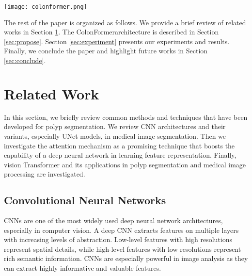 \documentclass{article}
\newcommand{\ModelName}{ColonFormer}
\begin{document}
\begin{figure*}[ht!]
\centering
\texttt{[image: colonformer.png]} 
\caption{The overall architecture of our \ModelName contains three components: an encoder, a decoder, and a refinement module. The encoder is based on the Mix Transformer backbone. The decoder starts with a pyramid pooling module (PPM), where its outputs are combined layer-wise with the output feature maps of the encoder at multi levels to produce a global map. The refinement module aims to gradually refine the boundary of the global map to yield the final accurate segmentation. 
Besides this predicted output, the global map and two intermediate maps are also passed into the training loss in a deep supervision manner. Before calculating the training loss, all refined maps are upsampled back to the original image input size.}
\label{fig:colonformer}
\end{figure*}

The rest of the paper is organized as follows. We provide a brief review of related works in Section \ref{sec:related}. The \ModelName architecture is described in Section \ref{sec:propose}. Section \ref{sec:experiment} presents our experiments and results. Finally, we conclude the paper and highlight future works in Section \ref{sec:conclude}.


\section{Related Work}
\label{sec:related}
In this section, we briefly review common methods and techniques that have been developed for polyp segmentation. We review CNN architectures and their variants, especially UNet models, in medical image segmentation. Then we investigate the attention mechanism as a promising technique that boosts the capability of a deep neural network in learning feature representation. Finally, vision Transformer and its applications in polyp segmentation and medical image processing are investigated.

\subsection{Convolutional Neural Networks}
CNNs are one of the most widely used deep neural network architectures, especially in computer vision. A deep CNN extracts features on multiple layers with increasing levels of abstraction. Low-level features with high resolutions represent spatial details, while high-level features with low resolutions represent rich semantic information. CNNs are especially powerful in image analysis as they can extract highly informative and valuable features. 
\end{document}
